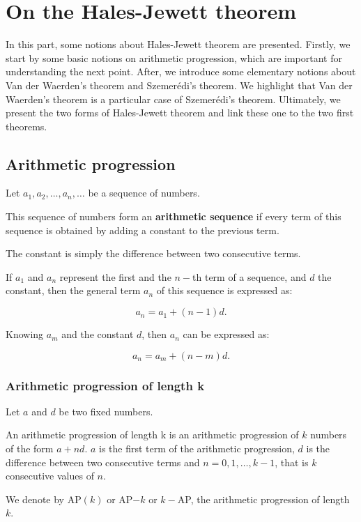 \chapter{On the Hales-Jewett theorem}

In this part, some notions about Hales-Jewett theorem are presented. Firstly, we start by some basic notions on arithmetic progression, which are important for understanding the next point. After, we introduce some elementary notions about  Van der Waerden’s theorem and  Szemerédi's theorem. We highlight that  Van der Waerden's theorem is a particular case of Szemerédi's theorem. Ultimately, we present the two forms of Hales-Jewett theorem and link these one to the two first theorems.

\section{Arithmetic progression}


\begin{defn}
Let $a_1, a_2, \ldots, a_n, \ldots$ be a sequence of numbers.  

This sequence of numbers form an \textbf{arithmetic sequence} if every term of this sequence is obtained by adding a constant to the previous term.
\end{defn}
The constant is simply the difference between two consecutive terms.

If $a_1$ and $a_n$ represent the first and the $n-$th term of a sequence, and $d$ the constant, then the general term $a_n$ of this sequence is expressed as:

$$a_n=a_1+(n-1)d.$$

Knowing $a_m$ and the constant $d$, then $a_n$ can be expressed as:
 
$$a_n=a_m+(n-m)d.$$

\subsection{Arithmetic progression of length k}


Let $a$ and $d$ be two fixed numbers.

An arithmetic progression of length k is an arithmetic progression of $k$ numbers of the form $a+nd.$ $a$ is the first term of the arithmetic progression, $d$ is the difference between two consecutive terms and $n=0,1, \ldots, k-1$, that is $k$ consecutive values of $n.$ 

We denote by AP$(k)$ or AP$-k$ or $k-$AP, the arithmetic progression of length $k.$


